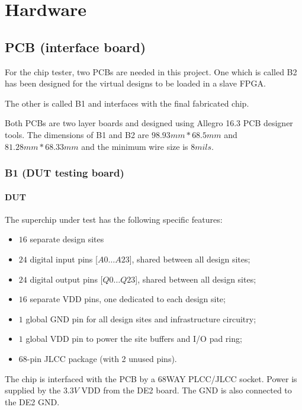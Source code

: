 \chapter{Hardware}


\section{PCB (interface board)}
For the chip tester, two PCBs are needed in this project. One which is called B2
has been designed for the virtual designs to be loaded in a slave FPGA.

The other is called B1 and interfaces with the final fabricated chip.

Both PCBs are two layer boards and designed using Allegro 16.3 PCB designer tools.
The dimensions of B1 and B2 are $98.93 mm* 68.5 mm$ and $81.28 mm * 68.33 mm$ and the minimum wire size is $8mils$.

\newpage
\subsection{B1 (DUT testing board)}

\subsubsection{DUT}

The superchip under test has the following specific features:
\begin{itemize}
 \item $16$ separate design sites
 \item $24$ digital input pins [$A0\dots A23$], shared between all design sites;
 \item $24$ digital output pins [$Q0\dots Q23$], shared between all design sites;
 \item $16$ separate VDD pins, one dedicated to each design site;
 \item $1$ global GND pin for all design sites and infrastructure circuitry;
 \item $1$ global VDD pin to power the site buffers and I/O pad ring;
 \item $68$-pin JLCC package (with 2 unused pins).
\end{itemize}

The chip is interfaced with the PCB by a 68WAY PLCC/JLCC socket. Power is
supplied by the $3.3V$ VDD from the DE2 board. The GND is also connected to the DE2 GND.

